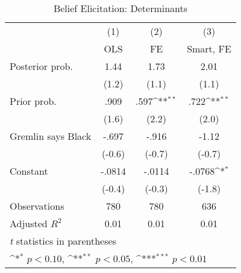 \begin{table}[htbp]\centering
\def\sym#1{\ifmmode^{#1}\else\(^{#1}\)\fi}
\caption{Belief Elicitation: Determinants}
\begin{tabular}{l*{3}{c}}
\hline\hline
                &\multicolumn{1}{c}{(1)}&\multicolumn{1}{c}{(2)}&\multicolumn{1}{c}{(3)}\\
                &\multicolumn{1}{c}{OLS}&\multicolumn{1}{c}{FE}&\multicolumn{1}{c}{Smart, FE}\\
\hline
Posterior prob. &     1.44         &     1.73         &     2.01         \\
                &    (1.2)         &    (1.1)         &    (1.1)         \\
Prior prob.     &     .909         &     .597\sym{**} &     .722\sym{**} \\
                &    (1.6)         &    (2.2)         &    (2.0)         \\
Gremlin says Black&    -.697         &    -.916         &    -1.12         \\
                &   (-0.6)         &   (-0.7)         &   (-0.7)         \\
Constant        &   -.0814         &   -.0114         &   -.0768\sym{*}  \\
                &   (-0.4)         &   (-0.3)         &   (-1.8)         \\
\hline
Observations    &      780         &      780         &      636         \\
Adjusted \(R^{2}\)&     0.01         &     0.01         &     0.01         \\
\hline\hline
\multicolumn{4}{l}{\footnotesize \textit{t} statistics in parentheses}\\
\multicolumn{4}{l}{\footnotesize \sym{*} \(p<0.10\), \sym{**} \(p<0.05\), \sym{***} \(p<0.01\)}\\
\end{tabular}
\end{table}
